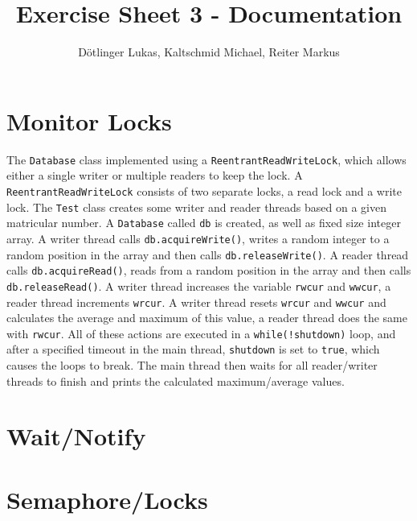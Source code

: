 \documentclass{article}
\begin{document}
	\title{Exercise Sheet 3 - Documentation}
	\date{}
	\author{Dötlinger Lukas, Kaltschmid Michael, Reiter Markus}

	\maketitle

  \section{Monitor Locks}

    The \texttt{Database} class implemented using a \texttt{ReentrantReadWriteLock}, which allows either a single writer or multiple readers to keep the lock. A \texttt{ReentrantReadWriteLock} consists of two separate locks, a read lock and a write lock.
    The \texttt{Test} class creates some writer and reader threads based on a given matricular number. A \texttt{Database} called \texttt{db} is created, as well as fixed size integer array.
    A writer thread calls \texttt{db.acquireWrite()}, writes a random integer to a random position in the array and then calls \texttt{db.releaseWrite()}.
    A reader thread calls \texttt{db.acquireRead()}, reads from a random position in the array and then calls \texttt{db.releaseRead()}.
    A writer thread increases the variable \texttt{rwcur} and \texttt{wwcur}, a reader thread increments \texttt{wrcur}.
    A writer thread resets \texttt{wrcur} and \texttt{wwcur} and calculates the average and maximum of this value, a reader thread does the same with \texttt{rwcur}.
    All of these actions are executed in a \texttt{while(!shutdown)} loop, and after a specified timeout in the main thread, \texttt{shutdown} is set to \texttt{true}, which causes the loops to break. The main thread then waits for all reader/writer threads to finish and prints the calculated maximum/average values.

  \section{Wait/Notify}

  \section{Semaphore/Locks}
\end{document}
